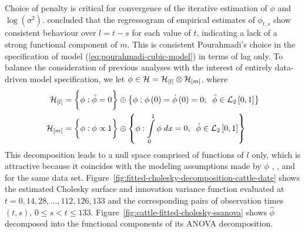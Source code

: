 \bigskip

Choice of penalty is critical for convergence of the iterative estimation of $\phi$ and $\log\left(\sigma^2 \right)$. \cite{pan2017jmcm} concluded that the regressogram of empirical estimates of $\phi_{t,s}$ show consistent behaviour over $l = t - s$ for each value of $t$, indicating a lack of a strong functional component of $m$. This is consistent Pourahmadi's choice in the specification of model (\ref{eq:pourahmadi-cubic-model}) in terms of lag only. To balance the consideration of previous analyses with the interest of entirely data-driven model specification, we let $\phi \in \mathcal{H} = \mathcal{H}_{\left[l\right]} \otimes \mathcal{H}_{\left[m\right]}$, where 
\begin{align*} 
\mathcal{H}_{\left[l\right]} &= \bigg\{ \phi: \ddot{\phi} = 0 \bigg\} \oplus \left\{\phi: \phi\left(0\right) = \dot{\phi}\left(0\right) = 0; \;\;\ddot{\phi} \in \mathcal{L}_2\left[0,1\right]   \right\} \\
\mathcal{H}_{\left[m\right]} &= \bigg\{ \phi: \phi \propto 1 \bigg\} \oplus \left\{ \phi: \int\limits_0^1 \phi \;dx = 0, \;\; \dot{\phi} \in \mathcal{L}_2\left[0,1\right]  \right\} 
\end{align*} 
This decomposition leads to a null space comprised of functions of $l$ only, which is attractive because it coincides with the modeling assumptions made by $\phi$ \cite{pan2017jmcm}, \cite{huang2006covariance}, and \cite{wu2003nonparametric} for the same data set.  Figure~\ref{fig:fitted-cholesky-decomposition-cattle-date} shows the estimated Cholesky surface and innovation variance function evaluated at $t =  0,14, 28,\dots,112, 126,133$ and the corresponding pairs of observation times $\left(t,s\right)$, $0 \le s < t \le 133$. Figure~\ref{fig:cattle-fitted-cholesky-ssanova} shows $\hat{\phi}$ decomposed into the functional components of its ANOVA decomposition.




